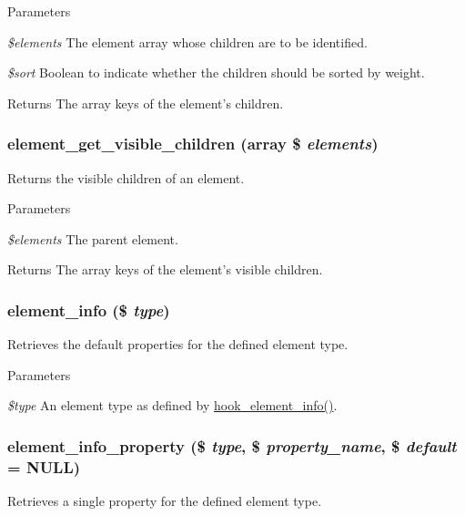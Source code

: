 \begin{DoxyParams}{Parameters}
\item[{\em \$elements}]The element array whose children are to be identified. \item[{\em \$sort}]Boolean to indicate whether the children should be sorted by weight.\end{DoxyParams}
\begin{DoxyReturn}{Returns}
The array keys of the element's children. 
\end{DoxyReturn}
\hypertarget{common_8inc_a16b95f134528bd21d59f2a9ece2b7d2f}{
\subsubsection[{element\_\-get\_\-visible\_\-children}]{\setlength{\rightskip}{0pt plus 5cm}element\_\-get\_\-visible\_\-children (array \$ {\em elements})}}
\label{common_8inc_a16b95f134528bd21d59f2a9ece2b7d2f}
Returns the visible children of an element.


\begin{DoxyParams}{Parameters}
\item[{\em \$elements}]The parent element.\end{DoxyParams}
\begin{DoxyReturn}{Returns}
The array keys of the element's visible children. 
\end{DoxyReturn}
\hypertarget{common_8inc_a5745b4e27c2946a902d49c0923f46739}{
\subsubsection[{element\_\-info}]{\setlength{\rightskip}{0pt plus 5cm}element\_\-info (\$ {\em type})}}
\label{common_8inc_a5745b4e27c2946a902d49c0923f46739}
Retrieves the default properties for the defined element type.


\begin{DoxyParams}{Parameters}
\item[{\em \$type}]An element type as defined by \hyperlink{group__hooks_ga3c5182432eddc82f8b7845e66a365d51}{hook\_\-element\_\-info()}. \end{DoxyParams}
\hypertarget{common_8inc_a0fbfab66764cb42fdd2f76609c91f5e7}{
\subsubsection[{element\_\-info\_\-property}]{\setlength{\rightskip}{0pt plus 5cm}element\_\-info\_\-property (\$ {\em type}, \/  \$ {\em property\_\-name}, \/  \$ {\em default} = {\ttfamily NULL})}}
\label{common_8inc_a0fbfab66764cb42fdd2f76609c91f5e7}
Retrieves a single property for the defined element type.


